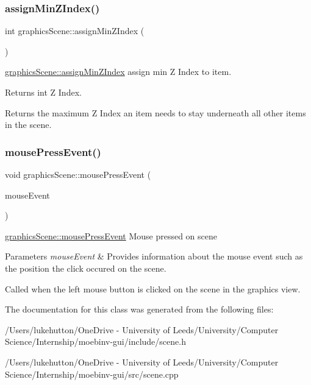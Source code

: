 \subsubsection{\texorpdfstring{assign\+Min\+Z\+Index()}{assignMinZIndex()}}
{\footnotesize\ttfamily int graphics\+Scene\+::assign\+Min\+Z\+Index (\begin{DoxyParamCaption}{ }\end{DoxyParamCaption})}



\mbox{\hyperlink{classgraphics_scene_aeb9feecebc1be01a976b14d6b20382d6}{graphics\+Scene\+::assign\+Min\+Z\+Index}} assign min Z Index to item. 

\begin{DoxyReturn}{Returns}
int Z Index.
\end{DoxyReturn}
Returns the maximum Z Index an item needs to stay underneath all other items in the scene. \mbox{\label{classgraphics_scene_a45ca641319ec6accb1574f52539e7517}} 
\subsubsection{\texorpdfstring{mouse\+Press\+Event()}{mousePressEvent()}}
{\footnotesize\ttfamily void graphics\+Scene\+::mouse\+Press\+Event (\begin{DoxyParamCaption}\item[{Q\+Graphics\+Scene\+Mouse\+Event $\ast$}]{mouse\+Event }\end{DoxyParamCaption})\hspace{0.3cm}{\ttfamily [virtual]}}



\mbox{\hyperlink{classgraphics_scene_a45ca641319ec6accb1574f52539e7517}{graphics\+Scene\+::mouse\+Press\+Event}} Mouse pressed on scene 


\begin{DoxyParams}{Parameters}
{\em mouse\+Event} & Provides information about the mouse event such as the position the click occured on the scene.\\
\hline
\end{DoxyParams}
Called when the left mouse button is clicked on the scene in the graphics view. 

The documentation for this class was generated from the following files\+:\begin{DoxyCompactItemize}
\item 
/\+Users/lukehutton/\+One\+Drive -\/ University of Leeds/\+University/\+Computer Science/\+Internship/moebinv-\/gui/include/scene.\+h\item 
/\+Users/lukehutton/\+One\+Drive -\/ University of Leeds/\+University/\+Computer Science/\+Internship/moebinv-\/gui/src/scene.\+cpp\end{DoxyCompactItemize}
